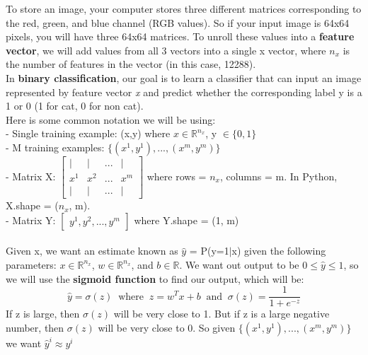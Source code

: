 \documentclass[11pt, a4paper]{article}
\begin{document}
\begin{spacing}{1.1}
	To store an image, your computer stores three different matrices corresponding to the red, green, and blue channel (RGB values). So if your input image is 64x64 pixels, you will have three 64x64 matrices. To unroll these values into a \textbf{feature vector}, we will add values from all 3 vectors into a single x vector, where $n_x$ is the number of features in the vector (in this case, 12288). \vspace*{2mm} \\
	In \textbf{binary classification}, our goal is to learn a classifier that can input an image represented by feature vector \textit{x} and predict whether the corresponding label y is a 1 or 0 (1 for cat, 0 for non cat). \vspace*{2mm} \\
	Here is some common notation we will be using: \vspace*{1mm} \\
	\hspace*{3mm} - Single training example: (x,y) where $x \in \mathbb{R}^{n_x}$, y $\in \{0,1\} $ \vspace*{1mm} \\
	\hspace*{3mm} - M training examples: $\{(x^1, y^1), ..., (x^m, y^m)\}$  \vspace*{1mm} \\
	\hspace*{3mm} - Matrix X: $\begin{bmatrix} | & | & ... & | \\ x^1 & x^2 & ... & x^m \\ | & | & ... & | \end{bmatrix}$ where rows = $n_x$, columns = m. In Python, X.shape = ($n_x$, m). \vspace*{2mm} \\
	\hspace*{3mm} - Matrix Y: $\begin{bmatrix} y^1, y^2, ..., y^m \end{bmatrix}$ where Y.shape = (1, m) \\~\\
	Given x, we want an estimate known as $\hat{y}$ = P(y=1$|$x) given the following parameters: $x \in \mathbb{R}^{n_x}$, $w \in \mathbb{R}^{n_x}$, and $b \in \mathbb{R}$. We want out output to be $0 \leq \hat{y} \leq 1$, so we will use the \textbf{sigmoid function} to find our output, which will be: $$ \hat{y} = \sigma (z) \;\; \text{where}\;\; z = w^Tx + b \;\; \text{and}\;\; \sigma(z) = \frac{1}{1+e^{-z}}$$ If z is large, then $\sigma(z)$ will be very close to 1. But if z is a large negative number, then $\sigma(z)$ will be very close to 0. So given $\{(x^1, y^1),...,(x^m,y^m)\}$ we want $\hat{y}^i \approx y^i$

\end{spacing}
\end{document}
